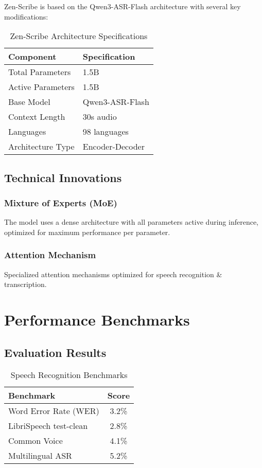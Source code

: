 \documentclass[11pt,a4paper]{article}
\begin{document}
Zen-Scribe is based on the Qwen3-ASR-Flash architecture with several key modifications:

\begin{table}[H]
\centering
\begin{tabular}{ll}
\toprule
\textbf{Component} & \textbf{Specification} \\
\midrule
Total Parameters & 1.5B \\
Active Parameters & 1.5B \\
Base Model & Qwen3-ASR-Flash \\
Context Length & 30s audio \\


Languages & 98 languages \\
Architecture Type & Encoder-Decoder \\
\bottomrule
\end{tabular}
\caption{Zen-Scribe Architecture Specifications}
\end{table}

\subsection{Technical Innovations}

\subsubsection{Mixture of Experts (MoE)}
The model uses a dense architecture with all parameters active during inference, optimized for maximum performance per parameter.

\subsubsection{Attention Mechanism}
Specialized attention mechanisms optimized for speech recognition & transcription.



\section{Performance Benchmarks}

\subsection{Evaluation Results}


\begin{table}[H]
\centering
\begin{tabular}{lc}
\toprule
\textbf{Benchmark} & \textbf{Score} \\
\midrule
Word Error Rate (WER) & 3.2\% \\
LibriSpeech test-clean & 2.8\% \\
Common Voice & 4.1\% \\
Multilingual ASR & 5.2\% \\
\bottomrule
\end{tabular}
\caption{Speech Recognition Benchmarks}
\end{table}
\end{document}
